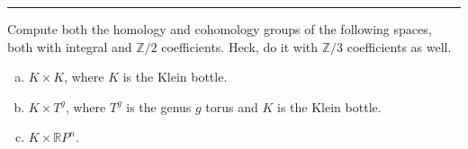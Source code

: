 \documentclass[a4paper, 12pt]{article}
\begin{document}
\noindent\rule{7in}{2.8pt}
\begin{problem}{4}
Compute both the homology and cohomology groups of the following spaces, both with integral and \(\mathbb{Z}/2\) coefficients. Heck, do it with \(\mathbb{Z}/3\) coefficients as well. 
\begin{enumerate}[(a)]
\item \(K\times K\), where \(K\) is the Klein bottle. 
\item \(K\times T^g\), where \(T^g\) is the genus \(g\) torus and \(K\) is the Klein bottle. 
\item \(K\times \mathbb{R}P^n\).
\end{enumerate}
\end{problem}
\begin{solution}

\end{solution}
\end{document}
